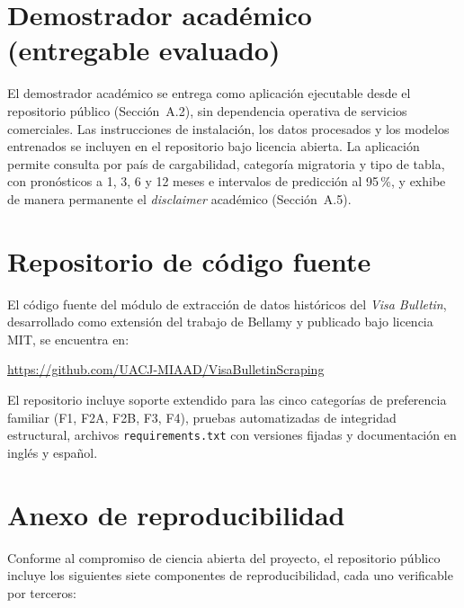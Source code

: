\documentclass[12pt,letterpaper]{report}
\begin{document}
\section{Demostrador académico (entregable evaluado)}

El demostrador académico se entrega como aplicación ejecutable desde el repositorio público (Sección~A.2), sin dependencia operativa de servicios comerciales. Las instrucciones de instalación, los datos procesados y los modelos entrenados se incluyen en el repositorio bajo licencia abierta. La aplicación permite consulta por país de cargabilidad, categoría migratoria y tipo de tabla, con pronósticos a 1, 3, 6 y 12 meses e intervalos de predicción al 95\,\%, y exhibe de manera permanente el \textit{disclaimer} académico (Sección~A.5).

\section{Repositorio de código fuente}

El código fuente del módulo de extracción de datos históricos del \textit{Visa Bulletin}, desarrollado como extensión del trabajo de Bellamy y publicado bajo licencia MIT, se encuentra en:
\begin{center}
\url{https://github.com/UACJ-MIAAD/VisaBulletinScraping}
\end{center}

El repositorio incluye soporte extendido para las cinco categorías de preferencia familiar (F1, F2A, F2B, F3, F4), pruebas automatizadas de integridad estructural, archivos \texttt{requirements.txt} con versiones fijadas y documentación en inglés y español.

\section{Anexo de reproducibilidad}

Conforme al compromiso de ciencia abierta del proyecto, el repositorio público incluye los siguientes siete componentes de reproducibilidad, cada uno verificable por terceros:
\end{document}
